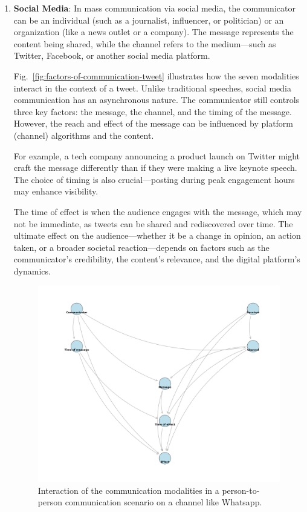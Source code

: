\begin{enumerate}
    \item \textbf{Social Media}: In mass communication via social media, the communicator can be an individual (such as a journalist, influencer, or politician) or an organization (like a news outlet or a company). The message represents the content being shared, while the channel refers to the medium—such as Twitter, Facebook, or another social media platform.
    
    Fig.~\ref{fig:factors-of-communication-tweet} illustrates how the seven modalities interact in the context of a tweet. Unlike traditional speeches, social media communication has an asynchronous nature. The communicator still controls three key factors: the message, the channel, and the timing of the message. However, the reach and effect of the message can be influenced by platform (channel) algorithms and the content.
    
    For example, a tech company announcing a product launch on Twitter might craft the message differently than if they were making a live keynote speech. The choice of timing is also crucial—posting during peak engagement hours may enhance visibility.
    
    The time of effect is when the audience engages with the message, which may not be immediate, as tweets can be shared and rediscovered over time. The ultimate effect on the audience—whether it be a change in opinion, an action taken, or a broader societal reaction—depends on factors such as the communicator’s credibility, the content’s relevance, and the digital platform’s dynamics.


\begin{figure}[!t]
    \centering
    \includegraphics[width=1.0\textwidth]{images/pgm_mass_communication_p2p.png}
    \caption{Interaction of the communication modalities in a person-to-person communication scenario on a channel like Whatsapp. 
    \label{fig:factors-of-communication-p2p}}
  \end{figure}



\end{enumerate}

